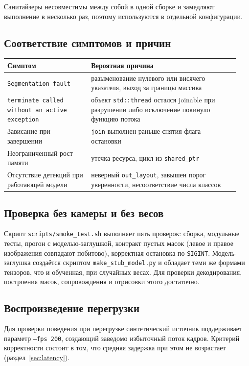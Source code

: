 \documentclass[11pt,a4paper]{article}
\theoremstyle{definition}
\theoremstyle{remark}
\begin{document}
Санитайзеры несовместимы между собой в одной сборке и замедляют выполнение в
несколько раз, поэтому используются в отдельной конфигурации.

\subsection{Соответствие симптомов и причин}

\begin{center}
\begin{tabular}{p{0.34\linewidth}p{0.60\linewidth}}
\toprule
Симптом & Вероятная причина \\
\midrule
\texttt{Segmentation fault} & разыменование нулевого или висячего указателя,
выход за границы массива \\
\texttt{terminate called without an active exception} & объект
\texttt{std::thread} остался joinable при разрушении либо исключение покинуло
функцию потока \\
Зависание при завершении & \texttt{join} выполнен раньше снятия флага
остановки \\
Неограниченный рост памяти & утечка ресурса, цикл из \texttt{shared\_ptr} \\
Отсутствие детекций при работающей модели & неверный \texttt{out\_layout},
завышен порог уверенности, несоответствие числа классов \\
\bottomrule
\end{tabular}
\end{center}

\subsection{Проверка без камеры и без весов}

Скрипт \texttt{scripts/smoke\_test.sh} выполняет пять проверок: сборка,
модульные тесты, прогон с моделью-заглушкой, контракт пустых масок (левое и
правое изображения совпадают побитово), корректная остановка по
\texttt{SIGINT}. Модель-заглушка создаётся скриптом
\texttt{make\_stub\_model.py} и обладает теми же формами тензоров, что и
обученная, при случайных весах. Для проверки декодирования, построения масок,
сопровождения и отрисовки этого достаточно.

\subsection{Воспроизведение перегрузки}

Для проверки поведения при перегрузке синтетический источник поддерживает
параметр \texttt{--fps 200}, создающий заведомо избыточный поток кадров.
Критерий корректности состоит в том, что средняя задержка при этом не
возрастает (раздел~\ref{sec:latency}).
\end{document}
